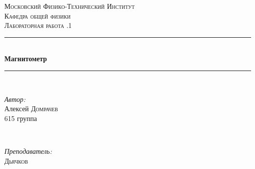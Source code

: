 \documentclass[a4paper, 12pt]{article}
\begin{document}
	\begin{titlepage}
		
		\newcommand{\HRule}{\rule{\linewidth}{0.5mm}} %
		
		\center %
		
		
		\textsc{\LARGE Московский Физико-Технический Институт}\\[1,5cm] %
		\textsc{\Large Кафедра общей физики}\\[0.5cm] %
		\textsc{\large Лабораторная работа .1}\\[0.5cm] %
		
		
		\HRule
		\\[0.4cm]
		{ \huge \bfseries Магнитометр}
		\\[0.2cm] %
		\HRule
		\\[1.5cm]
		
		
		
		
		\begin{minipage}{0.4\textwidth}
			\begin{flushleft} \large
				\emph{Автор:}\\
				Алексей \textsc{Домрачев} \\
				615 группа
			\end{flushleft}
		\end{minipage}
		~
		\begin{minipage}{0.4\textwidth}
			\begin{flushright} \large
				\emph{Преподаватель:} \\
				\textsc{Дьячков} %
			\end{flushright}
		\end{minipage}
		

\end{titlepage}
\end{document}
